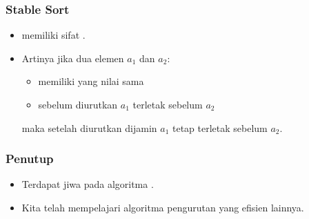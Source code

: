 \begin{frame}
\frametitle{Stable Sort}
\begin{itemize}
  \item \fQuickSort memiliki sifat  .
  \item Artinya jika dua elemen $a_1$ dan $a_2$:
  \begin{itemize}
    \item memiliki yang nilai sama
    \item sebelum diurutkan $a_1$ terletak sebelum $a_2$
  \end{itemize}
  maka setelah diurutkan  dijamin $a_1$ tetap terletak sebelum $a_2$.
\end{itemize}
\end{frame}

\begin{frame}
\frametitle{Penutup}
\begin{itemize}
  \item Terdapat jiwa \fDivideAndConquer pada algoritma \fQuickSort.
  \item Kita telah mempelajari algoritma pengurutan yang efisien lainnya.
\end{itemize}
\end{frame}


